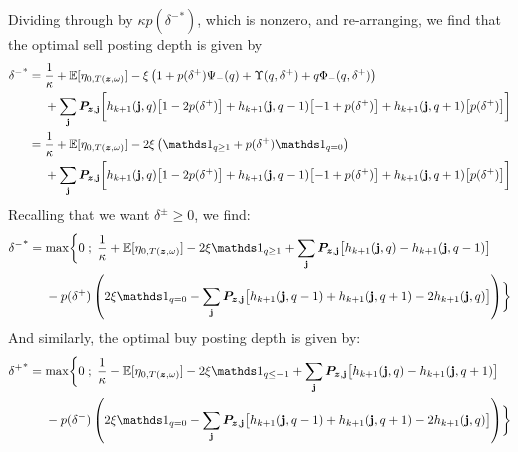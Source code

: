 Dividing through by $\kappa p({\delta^-}^*)$, which is nonzero, and re-arranging, we find that the optimal sell posting depth is given by
\begin{align}
\begin{split}
{\delta^-}^* & = \frac{1}{\kappa} + \E[\eta_{0,T(\bz, \omega)}] - \xi \left( 1 + p(\delta^+)\Psi_-(q) + \Upsilon(q,\delta^+) + q \Phi_-(q,\delta^+) \right) \\
& \hphantom{{}={}} +  \sum_\bj \bP_{\bz,\bj} \biggl[ h_{k+1}(\bj, q) \bigl[ 1 - 2 p(\delta^+) \bigr] + h_{k+1}(\bj, q-1) \bigl[-1 + p(\delta^+) \bigr] + h_{k+1}(\bj, q+1) \bigl[ p(\delta^+) \bigr] \biggr]
\end{split} \\
\begin{split}
& = \frac{1}{\kappa} + \E[\eta_{0,T(\bz, \omega)}] - 2 \xi \left( \indicator_{q \geq 1} + p(\delta^+)\indicator_{q = 0} \right) \\
& \hphantom{{}={}} +  \sum_\bj \bP_{\bz,\bj} \biggl[ h_{k+1}(\bj, q) \bigl[ 1 - 2 p(\delta^+) \bigr] + h_{k+1}(\bj, q-1) \bigl[-1 + p(\delta^+) \bigr] + h_{k+1}(\bj, q+1) \bigl[ p(\delta^+) \bigr] \biggr]
\end{split}
\end{align}
Recalling that we want $\delta^\pm \geq 0$, we find:
\begin{equation}\label{eq:discretedeltaminusreferential}
\begin{split}
{\delta^-}^* & = \max \biggl\lbrace 0 \; ; \; \frac{1}{\kappa} + \E[\eta_{0,T(\bz, \omega)}] - 2 \xi \indicator_{q \geq 1} + \sum_\bj \bP_{\bz,\bj} \bigl[ h_{k+1}(\bj, q) - h_{k+1}(\bj, q-1) \bigr] \\
& \hphantom{{}={}} -p(\delta^+) \left( 2 \xi \indicator_{q = 0} - \sum_\bj \bP_{\bz,\bj} \bigl[ h_{k+1}(\bj, q-1) + h_{k+1}(\bj, q+1) -2 h_{k+1}(\bj, q)  \bigr] \right) \biggr\rbrace
\end{split}
\end{equation}
And similarly, the optimal buy posting depth is given by:
\begin{equation}\label{eq:discretedeltaplusreferential}
\begin{split}
{\delta^+}^* & = \max \biggl\lbrace 0 \; ; \; \frac{1}{\kappa} - \E[\eta_{0,T(\bz, \omega)}] - 2 \xi \indicator_{q \leq -1} + \sum_\bj \bP_{\bz,\bj} \bigl[ h_{k+1}(\bj, q) - h_{k+1}(\bj, q+1) \bigr] \\
& \hphantom{{}={}} -p(\delta^-) \left( 2 \xi \indicator_{q = 0} - \sum_\bj \bP_{\bz,\bj} \bigl[ h_{k+1}(\bj, q-1) + h_{k+1}(\bj, q+1) -2 h_{k+1}(\bj, q)  \bigr] \right) \biggr\rbrace
\end{split}
\end{equation}
